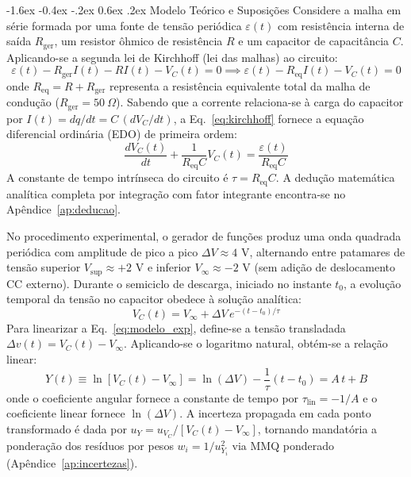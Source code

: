 \documentclass[12pt, a4paper]{article}
\makeatletter
\renewcommand\section{\@startsection {section}{1}{\z@}%
                                   {-1.6ex \@plus -0.4ex \@minus -.2ex}%
                                   {0.6ex \@plus .2ex}%
                                   {\normalfont\large\bfseries}}
\makeatother
\begin{document}
\section{Modelo Teórico e Suposições}
\vspace{-0.15cm}
Considere a malha em série formada por uma fonte de tensão periódica $\varepsilon(t)$ com resistência interna de saída $R_{\text{ger}}$, um resistor ôhmico de resistência $R$ e um capacitor de capacitância $C$. Aplicando-se a segunda lei de Kirchhoff (lei das malhas) ao circuito:
\begin{equation}
    \varepsilon(t) - R_{\text{ger}} I(t) - R I(t) - V_C(t) = 0 \implies \varepsilon(t) - R_{\text{eq}} I(t) - V_C(t) = 0 \label{eq:kirchhoff}
\end{equation}
onde $R_{\text{eq}} = R + R_{\text{ger}}$ representa a resistência equivalente total da malha de condução ($R_{\text{ger}} = 50\ \Omega$). Sabendo que a corrente relaciona-se à carga do capacitor por $I(t) = dq/dt = C \, (dV_C/dt)$, a Eq.~\eqref{eq:kirchhoff} fornece a equação diferencial ordinária (EDO) de primeira ordem:
\begin{equation}
    \frac{dV_C(t)}{dt} + \frac{1}{R_{\text{eq}}C} V_C(t) = \frac{\varepsilon(t)}{R_{\text{eq}}C} \label{eq:edo}
\end{equation}
A constante de tempo intrínseca do circuito é $\tau = R_{\text{eq}} C$. A dedução matemática analítica completa por integração com fator integrante encontra-se no Apêndice~\ref{ap:deducao}.

No procedimento experimental, o gerador de funções produz uma onda quadrada periódica com amplitude de pico a pico $\Delta V \approx 4\text{ V}$, alternando entre patamares de tensão superior $V_{\text{sup}} \approx +2\text{ V}$ e inferior $V_{\infty} \approx -2\text{ V}$ (sem adição de deslocamento CC externo). Durante o semiciclo de descarga, iniciado no instante $t_0$, a evolução temporal da tensão no capacitor obedece à solução analítica:
\begin{equation}
    V_C(t) = V_{\infty} + \Delta V \, e^{-(t - t_0)/\tau} \label{eq:modelo_exp}
\end{equation}
Para linearizar a Eq.~\eqref{eq:modelo_exp}, define-se a tensão transladada $\Delta v(t) = V_C(t) - V_{\infty}$. Aplicando-se o logaritmo natural, obtém-se a relação linear:
\begin{equation}
    Y(t) \equiv \ln[V_C(t) - V_{\infty}] = \ln(\Delta V) - \frac{1}{\tau} (t - t_0) = A \, t + B \label{eq:linearizacao}
\end{equation}
onde o coeficiente angular fornece a constante de tempo por $\tau_{\text{lin}} = -1/A$ e o coeficiente linear fornece $\ln(\Delta V)$. A incerteza propagada em cada ponto transformado é dada por $u_{Y} = u_{V_C} / [V_C(t) - V_{\infty}]$, tornando mandatória a ponderação dos resíduos por pesos $w_i = 1/u_{Y_i}^2$ via MMQ ponderado~\cite{vuolo} (Apêndice~\ref{ap:incertezas}).
\end{document}
